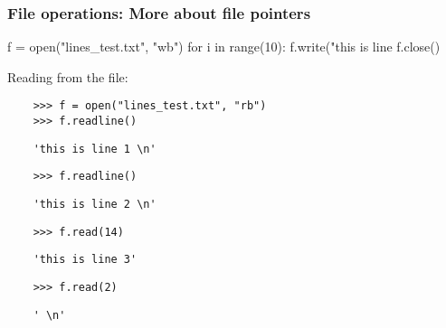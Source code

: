 \begin{frame}[fragile]

  \frametitle{File operations: More about file pointers}

  \begin{mlinepython}
    f = open("lines_test.txt", "wb")
    for i in range(10):
        f.write("this is line %
    f.close()
  \end{mlinepython}
  \pause
  \bigskip

  Reading from the file:
  \smallskip

  \begin{verbatim}
    >>> f = open("lines_test.txt", "rb")
    >>> f.readline()
  \end{verbatim}
  \pause
  \vspace{-10pt}
  \begin{verbatim}
    'this is line 1 \n'
  \end{verbatim}
  \pause
  \vspace{-10pt}
  \begin{verbatim}
    >>> f.readline()
  \end{verbatim}
  \pause
  \vspace{-10pt}
  \begin{verbatim}
    'this is line 2 \n'
  \end{verbatim}
  \pause
  \vspace{-10pt}
  \begin{verbatim}
    >>> f.read(14)
  \end{verbatim}
  \pause
  \vspace{-10pt}
  \begin{verbatim}
    'this is line 3'
  \end{verbatim}
  \pause
  \vspace{-10pt}
  \begin{verbatim}
    >>> f.read(2)
  \end{verbatim}
  \pause
  \vspace{-10pt}
  \begin{verbatim}
    ' \n'
  \end{verbatim}

\end{frame}


